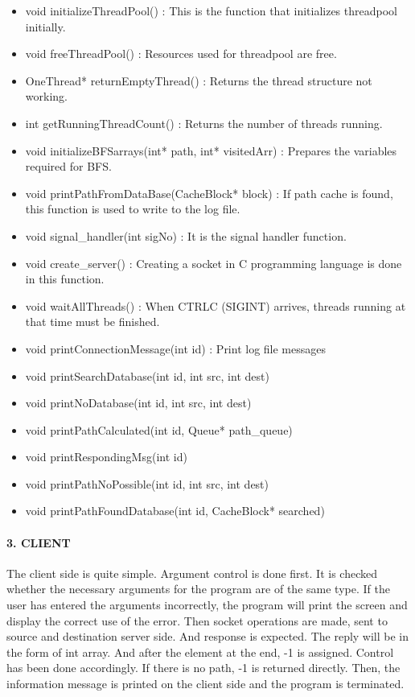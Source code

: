 \documentclass[a4paper,12pt]{report}
\begin{document}
\begin{itemize}
    \item void initializeThreadPool() : This is the function that initializes threadpool initially.
    \item void freeThreadPool() :  Resources used for threadpool are free.
    \item OneThread* returnEmptyThread() : Returns the thread structure not working.
    \item int getRunningThreadCount() : Returns the number of threads running.
    \item void initializeBFSarrays(int* path, int* visitedArr) : Prepares the variables required for BFS.
    \item void printPathFromDataBase(CacheBlock* block) : If path cache is found, this function is used to write to the log file.
    \item void signal\_handler(int sigNo) : It is the signal handler function.
    \item void create\_server() : Creating a socket in C programming language is done in this function.
    \item void waitAllThreads() : When CTRLC (SIGINT) arrives, threads running at that time must be finished.
    \item void printConnectionMessage(int id) : Print log file messages
    \item void printSearchDatabase(int id, int src, int dest)
    \item void printNoDatabase(int id, int src, int dest)
    \item void printPathCalculated(int id, Queue* path\_queue)
    \item void printRespondingMsg(int id)
    \item void printPathNoPossible(int id, int src, int dest)
    \item void printPathFoundDatabase(int id, CacheBlock* searched) 
\end{itemize}

\paragraph{3. CLIENT\newline}
The client side is quite simple. Argument control is done first. It is checked whether the necessary arguments for the program are of the same type. If the user has entered the arguments incorrectly, the program will print the screen and display the correct use of the error. Then socket operations are made, sent to source and destination server side. And response is expected. The reply will be in the form of int array. And after the element at the end, -1 is assigned. Control has been done accordingly. If there is no path, -1 is returned directly. Then, the information message is printed on the client side and the program is terminated.
\end{document}
